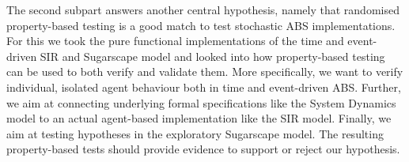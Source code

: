 The second subpart answers another central hypothesis, namely that randomised property-based testing is a good match to test stochastic ABS implementations. For this we took the pure functional implementations of the time and event-driven SIR and Sugarscape model and looked into how property-based testing can be used to both verify and validate them. More specifically, we want to verify individual, isolated agent behaviour both in time and event-driven ABS. Further, we aim at connecting underlying formal specifications like the System Dynamics model to an actual agent-based implementation like the SIR model. Finally, we aim at testing hypotheses in the exploratory Sugarscape model. The resulting property-based tests should provide evidence to support or reject our hypothesis.